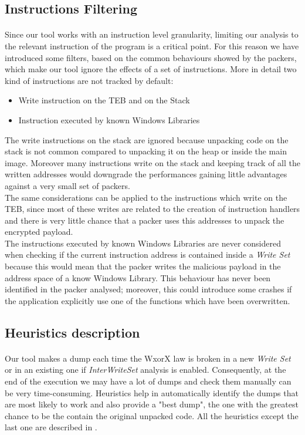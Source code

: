 \subsection{Instructions Filtering}
\paragraph{}
Since our tool works with an instruction level granularity, limiting our analysis to the relevant instruction of the program is a critical point. For this reason we have introduced some filters, based on the common behaviours showed by the packers, which make our tool ignore the effects of a set of instructions. More in detail two kind of instructions are not tracked by default:
\begin{itemize}
	\item Write instruction on the TEB and on the Stack
	\item Instruction executed by known Windows Libraries
\end{itemize}
The write instructions on the stack are ignored because unpacking code on the stack is not common compared to unpacking it on the heap or inside the main image. Moreover many instructions write on the stack and keeping track of all the written addresses would downgrade the performances gaining little advantages against a very small set of packers.\\
The same considerations can be applied to the instructions which write on the TEB, since most of these writes are related to the creation of instruction handlers and there is very little chance that a packer uses this addresses to unpack the encrypted payload.\\
The instructions executed by known Windows Libraries are never considered when checking if the current instruction address is contained inside a \textit{Write Set} because this would mean that the packer writes the malicious payload in the address space of a know Windows Library. This behaviour has never been identified in the packer analysed; moreover, this could introduce some crashes if the application explicitly use one of the functions which have been overwritten.

\subsection{Heuristics description}
\paragraph{}
Our tool makes a dump each time the WxorX law is broken in a new \textit{Write Set} or in an existing one if \textit{InterWriteSet} analysis is enabled. Consequently, at the end of the execution we may have a lot of dumps and check them manually can be very time-consuming. Heuristics help in automatically identify the dumps that are most likely to work and also provide a "best dump", the one with the greatest chance to be the contain the original unpacked code. All the heuristics except the last one are described in \cite{Practical_Malware_Analysis}.\\ 
